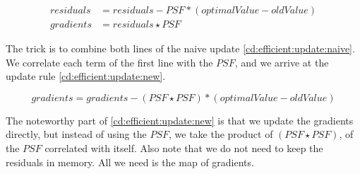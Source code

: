 \begin{equation}\label{cd:efficient:update:naive}
\begin{split}
residuals &= residuals - PSF * (optimalValue - oldValue) \\
gradients &= residuals \star PSF
\end{split}
\end{equation}

The trick is to combine both lines of the naive update \eqref{cd:efficient:update:naive}. We correlate each term of the first line with the $PSF$, and we arrive at the update rule \eqref{cd:efficient:update:new}.

\begin{equation}\label{cd:efficient:update:new}
gradients = gradients - (PSF \star PSF) * (optimalValue - oldValue)
\end{equation}

The noteworthy part of \eqref{cd:efficient:update:new} is that we update the gradients directly, but instead of using the $PSF$, we take the product of $(PSF \star PSF)$, of the $PSF$ correlated with itself. Also note that we do not need to keep the residuals in memory. All we need is the map of gradients. 

